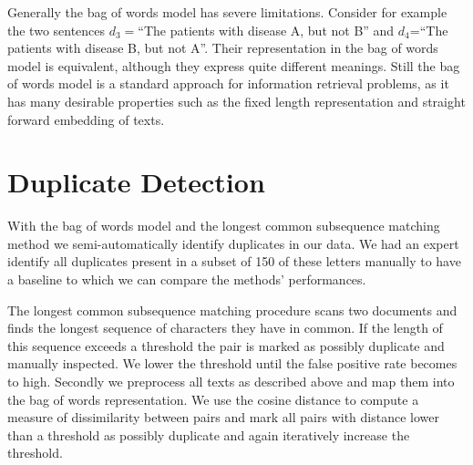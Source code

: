 Generally the bag of words model has severe limitations. Consider for example
the two sentences $d_{3}=$``The patients with disease A, but not B'' and $d_{4}$=``The patients with disease B, but not A''. Their representation in the bag of words model is equivalent,
although they express quite different meanings. Still the bag of words
model is a standard approach for information retrieval problems, as
it has many desirable properties such as the fixed length representation and straight forward embedding of texts.



\section{Duplicate Detection}

With the bag of words model and the longest common subsequence matching method we semi-automatically identify duplicates in our data. We had an expert identify all duplicates present in a subset of 150 of these letters manually to have a baseline to which we can compare the methods' performances.

The longest common subsequence matching procedure scans two documents and finds the longest sequence of characters they have in common. If the length of this sequence exceeds a threshold the pair is marked as possibly duplicate and manually inspected. We lower the threshold until the false positive rate becomes to high. Secondly we preprocess all texts as described above and map them into the bag of words representation. We use the cosine distance to compute a measure of dissimilarity between pairs and mark all pairs with distance lower than a threshold as possibly duplicate and again iteratively increase the threshold.

